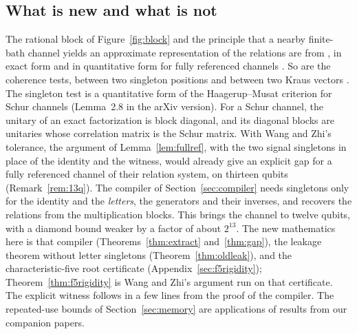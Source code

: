 \documentclass[11pt]{article}
\begin{document}
\subsection{What is new and what is not}\label{sec:new}
The rational block of Figure~\ref{fig:block} and the principle that a nearby finite-bath channel yields an approximate representation of the relations are from \cite{MghirbiDouglasV1}, in exact form \cite[Lemma~2 and Proposition~3]{MghirbiDouglasV1} and in quantitative form for fully referenced channels \cite[Theorems~6 and~I.1]{MghirbiDouglasV1}.  So are the coherence tests, between two singleton positions and between two Kraus vectors \cite[Theorems~5 and~I.1]{MghirbiDouglasV1}.  The singleton test is a quantitative form of the Haagerup--Musat criterion for Schur channels \cite[Proposition~2.8]{HaagerupMusat11} (Lemma~2.8 in the arXiv version).  For a Schur channel, the unitary of an exact factorization is block diagonal, and its diagonal blocks are unitaries whose correlation matrix is the Schur matrix.  With Wang and Zhi's tolerance, the argument of Lemma~\ref{lem:fullref}, with the two signal singletons in place of the identity and the witness, would already give an explicit gap for a fully referenced channel of their relation system, on thirteen qubits (Remark~\ref{rem:13q}).  The compiler of Section~\ref{sec:compiler} needs singletons only for the identity and the \emph{letters}, the generators and their inverses, and recovers the relations from the multiplication blocks.  This brings the channel to twelve qubits, with a diamond bound weaker by a factor of about $2^{13}$.  The new mathematics here is that compiler (Theorems~\ref{thm:extract} and~\ref{thm:gap}), the leakage theorem without letter singletons (Theorem~\ref{thm:oldleak}), and the characteristic-five root certificate (Appendix~\ref{sec:f5rigidity}); Theorem~\ref{thm:f5rigidity} is Wang and Zhi's argument run on that certificate.  The explicit witness follows in a few lines from the proof of the compiler.  The repeated-use bounds of Section~\ref{sec:memory} are applications of results from our companion papers.
\end{document}
